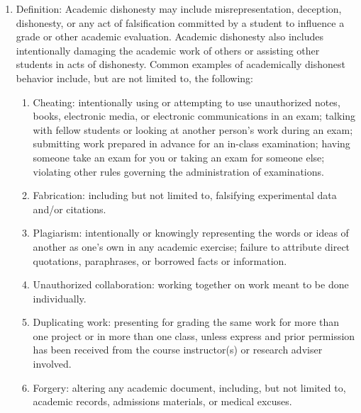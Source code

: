 \documentclass[10pt]{article}
\begin{document}
\begin{enumerate}[label=\Alph*.]
	\item	Definition: Academic dishonesty may include misrepresentation, deception, dishonesty, or any act of falsification committed by a student to influence a grade or other academic evaluation. Academic dishonesty also includes intentionally damaging the academic work of others or assisting other students in acts of dishonesty. Common examples of academically dishonest behavior include, but are not limited to, the following:
	\begin{enumerate}[label=\arabic*.]\itemsep0em 
		\item	Cheating: intentionally using or attempting to use unauthorized notes, books, electronic media, or electronic communications in an exam; talking with fellow students or looking at another person’s work during an exam; submitting work prepared in advance for an in-class examination; having someone take an exam for you or taking an exam for someone else; violating other rules governing the administration of examinations.
		\item	Fabrication:  including but not limited to, falsifying experimental data and/or citations.
		\item	Plagiarism: intentionally or knowingly representing the words or ideas of another as one’s own in any academic exercise; failure to attribute direct quotations, paraphrases, or borrowed facts or information. 
		\item	Unauthorized collaboration: working together on work meant to be done individually.
		\item	Duplicating work: presenting for grading the same work for more than one project or in more than one class, unless express and prior permission has been received from the course instructor(s) or research adviser involved. 
		\item	Forgery: altering any academic document, including, but not limited to, academic records, admissions materials, or medical excuses.
	\end{enumerate}
\end{enumerate}
\end{document}
